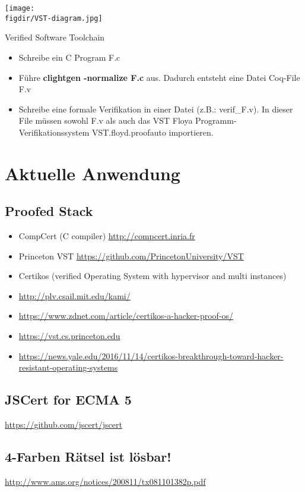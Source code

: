 \begin{minipage}{\textwidth}
	\centering
	\captionsetup{type=figure}
	\texttt{[image: \\figdir/VST-diagram.jpg]}
	\caption{Verified Software Toolchain\cite{PRINCETON01:VST}}
	\label{fig:vst}
\end{minipage}

\begin{itemize} 
	\item Schreibe ein C Program F.c
	\item Führe \textbf{clightgen -normalize F.c} aus. Dadurch entsteht eine Datei Coq-File F.v
	\item Schreibe eine formale Verifikation in einer Datei (z.B.: verif\_F.v). In dieser File müssen sowohl F.v als auch das VST Floya Programm-Verifikationssystem VST.floyd.proofauto importieren.\cite{Appel01:VST}
\end{itemize}



\section{Aktuelle Anwendung}
\label{s:current-usage}

\subsection{Proofed Stack}
\begin{itemize}
	\item CompCert (C compiler) \url{http://compcert.inria.fr}
	\item Princeton VST \url{https://github.com/PrincetonUniversity/VST}
	\item Certikos (verified Operating System with hypervisor and multi instances)
	\item \url{http://plv.csail.mit.edu/kami/}
	\item \url{https://www.zdnet.com/article/certikos-a-hacker-proof-os/}
	\item \url{https://vst.cs.princeton.edu}
	\item \url{https://news.yale.edu/2016/11/14/certikos-breakthrough-toward-hacker-resistant-operating-systems}
\end{itemize}
\subsection{JSCert for ECMA 5}
\url{https://github.com/jscert/jscert}
\subsection{4-Farben Rätsel ist lösbar!}
\url{http://www.ams.org/notices/200811/tx081101382p.pdf}
